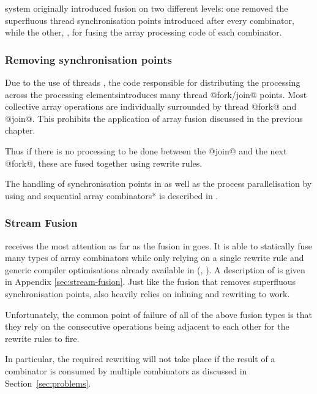 \documentclass[preamble.tex]{subfiles}
\begin{document}
\DPH system originally introduced fusion on two different levels: one removed the superfluous thread synchronisation points introduced after every combinator, while the other, , for fusing the array processing code of each combinator.


\subsubsection{Removing synchronisation points}

Due to the use of \Haskell threads \cite{Jones08atutorial}, the code responsible for distributing the processing across the processing elements\ipe introduces many thread @fork/join@ points. Most collective array operations are individually surrounded by thread @fork@ and @join@. This prohibits the application of array fusion discussed in the previous chapter.

Thus if there is no processing to be done between the @join@ and the next @fork@, these are fused together using rewrite rules\irwrules \cite{PTH01}.

The handling of synchronisation points in \DPH as well as the process parallelisation by using  and \*sequential array combinators* is described in \cite{CLP+07}.


\subsubsection{Stream Fusion}

\isf receives the most attention as far as the fusion in \DPH goes. It is able to statically fuse many types of array combinators while only relying on a single rewrite rule and generic compiler optimisations already available in \GHC (\cite{GHCOptimiser}, \cite{SpecConstr}). A description of  is given in Appendix \ref{sec:stream-fusion}. Just like the fusion that removes superfluous synchronisation points,  also heavily relies on inlining \cite{PM02} and rewriting \cite{PTH01} to work.

Unfortunately, the common point of failure of all of the above fusion types is that they rely on the consecutive operations being adjacent to each other for the rewrite rules to fire.

In particular, the required rewriting will not take place if the result of a combinator is consumed by multiple combinators as discussed in Section~\ref{sec:problems}. 
\end{document}
